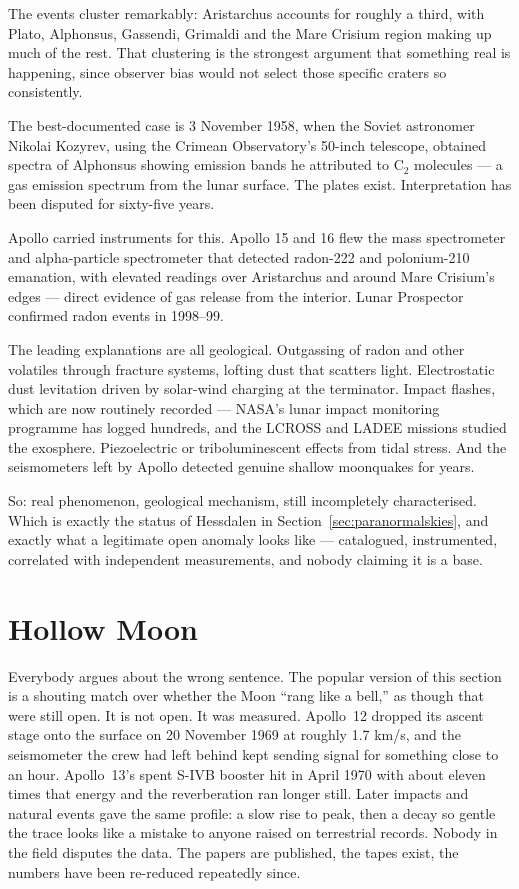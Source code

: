 The events cluster remarkably: Aristarchus accounts for roughly a third, with Plato, Alphonsus,
Gassendi, Grimaldi and the Mare Crisium region making up much of the rest. That clustering is the
strongest argument that something real is happening, since observer bias would not select those
specific craters so consistently.

The best-documented case is 3 November 1958, when the Soviet astronomer Nikolai Kozyrev, using the
Crimean Observatory's 50-inch telescope, obtained spectra of Alphonsus showing emission bands he
attributed to $\mathrm{C_2}$ molecules --- a gas emission spectrum from the lunar surface. The
plates exist. Interpretation has been disputed for sixty-five years.

Apollo carried instruments for this. Apollo 15 and 16 flew the mass spectrometer and alpha-particle
spectrometer that detected radon-222 and polonium-210 emanation, with elevated readings over
Aristarchus and around Mare Crisium's edges --- direct evidence of gas release from the interior.
Lunar Prospector confirmed radon events in 1998--99.

The leading explanations are all geological. Outgassing of radon and other volatiles through
fracture systems, lofting dust that scatters light. Electrostatic dust levitation driven by
solar-wind charging at the terminator. Impact flashes, which are now routinely recorded --- NASA's
lunar impact monitoring programme has logged hundreds, and the LCROSS and LADEE missions studied
the exosphere. Piezoelectric or triboluminescent effects from tidal stress. And the seismometers
left by Apollo detected genuine shallow moonquakes for years.

So: real phenomenon, geological mechanism, still incompletely characterised. Which is exactly the
status of Hessdalen in Section~\ref{sec:paranormalskies}, and exactly what a legitimate open anomaly looks like ---
catalogued, instrumented, correlated with independent measurements, and nobody claiming it is a
base.

\section{Hollow Moon}\label{sec:hollowmoon}

Everybody argues about the wrong sentence. The popular version of this section is a shouting match
over whether the Moon ``rang like a bell,'' as though that were still open. It is not open. It was
measured. Apollo~12 dropped its ascent stage onto the surface on 20 November 1969 at roughly 1.7
km/s, and the seismometer the crew had left behind kept sending signal for something close to an
hour. Apollo~13's spent S-IVB booster hit in April 1970 with about eleven times that energy and the
reverberation ran longer still. Later impacts and natural events gave the same profile: a slow rise
to peak, then a decay so gentle the trace looks like a mistake to anyone raised on terrestrial
records. Nobody in the field disputes the data. The papers are published, the tapes exist, the
numbers have been re-reduced repeatedly since.

